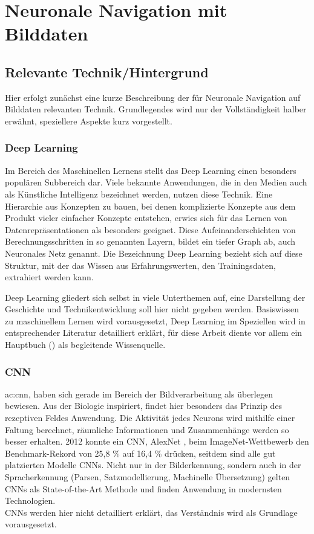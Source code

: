 
%
\chapter{Neuronale Navigation mit Bilddaten}

\section{Relevante Technik/Hintergrund}
Hier erfolgt zunächst eine kurze Beschreibung der für Neuronale Navigation auf Bilddaten relevanten Technik. Grundlegendes wird nur der Vollständigkeit halber erwähnt, speziellere Aspekte kurz vorgestellt. 

\subsection{Deep Learning}
Im Bereich des Maschinellen Lernens stellt das Deep Learning einen besonders populären Subbereich dar. Viele bekannte Anwendungen, die in den Medien auch als Künstliche Intelligenz bezeichnet werden, nutzen diese Technik. Eine Hierarchie aus Konzepten zu bauen, bei denen komplizierte Konzepte aus dem Produkt vieler einfacher Konzepte entstehen, erwies sich für das Lernen von Datenrepräsentationen als besonders geeignet. Diese Aufeinanderschichten von Berechnungsschritten in so genannten Layern, bildet ein tiefer Graph ab, auch Neuronales Netz genannt. Die Bezeichnung Deep Learning bezieht sich auf diese Struktur, mit der das Wissen aus Erfahrungswerten, den Trainingsdaten, extrahiert werden kann.

Deep Learning gliedert sich selbst in viele Unterthemen auf, eine Darstellung der Geschichte und Technikentwicklung soll hier nicht gegeben werden. Basiswissen zu maschinellem Lernen wird vorausgesetzt, Deep Learning im Speziellen wird in entsprechender Literatur detailliert erklärt, für diese Arbeit diente vor allem ein Hauptbuch (\cite{Goodfellow-et-al-2016}) als begleitende Wissenquelle.


\subsection{CNN}
\gls{ac:cnn}, haben sich gerade im Bereich der Bildverarbeitung als überlegen bewiesen. Aus der Biologie inspiriert, findet hier besonders das Prinzip des rezeptiven Feldes Anwendung. Die Aktivität jedes Neurons wird mithilfe einer Faltung berechnet, räumliche Informationen und Zusammenhänge werden so besser erhalten. 2012 konnte ein CNN, AlexNet \cite{krizhevsky2012imagenet}, beim ImageNet-Wettbewerb den Benchmark-Rekord von 25,8 \% auf 16,4 \% drücken, seitdem sind alle gut platzierten Modelle CNNs. Nicht nur in der Bilderkennung, sondern auch in der Spracherkennung (Parsen, Satzmodellierung, Machinelle Übersetzung) gelten CNNs als State-of-the-Art Methode und finden Anwendung in modernsten Technologien.\\
CNNs werden hier nicht detailliert erklärt, das Verständnis wird als Grundlage vorausgesetzt.

